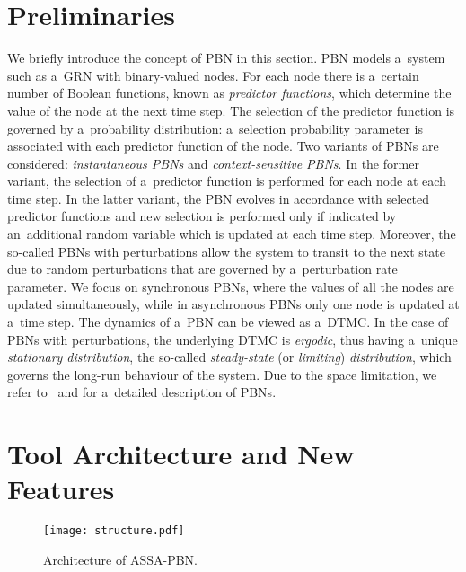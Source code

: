 \documentclass[runningheads,a4paper]{llncs}
\begin{document}
\section{Preliminaries}
\label{sec:pre}
We briefly introduce the concept of PBN in this section.
PBN models a~system such as a~GRN with binary-valued nodes. For each node there is a~certain
number of Boolean functions, known as \emph{predictor functions}, which determine the value of the
node at the next time step. The selection of the predictor function is governed by a~probability
distribution: a~selection probability parameter is associated with each predictor function of the
node. Two variants of PBNs are considered: \emph{instantaneous PBNs} and \emph{context-sensitive PBNs}. In
the former variant, the selection of a~predictor function is performed for each node at each time
step. In the latter variant, the PBN evolves in accordance with selected predictor functions and
new selection is performed only if indicated by an~additional random variable which is updated at
each time step. Moreover, the so-called PBNs with perturbations allow the system to transit to
the next state due to random perturbations that are governed by a~perturbation rate parameter.
We focus on synchronous PBNs, where the values of all the nodes are updated simultaneously,
while in asynchronous PBNs only one node is updated at a~time step.
The dynamics of a~PBN can be viewed as a~DTMC. In the case
of PBNs with perturbations, the underlying DTMC is \emph{ergodic}, thus having a~unique
\emph{stationary distribution}, the so-called \emph{steady-state} (or \emph{limiting})
\emph{distribution}, which governs the long-run behaviour of the system. Due to the space
limitation, we refer to~\cite{SD10} and \cite[page~4]{TMPTSS13} for a~detailed description of PBNs.

\section{Tool Architecture and New Features}
\label{sec:arc}
\begin{figure}[!t]
\centering
\texttt{[image: structure.pdf]}
\caption{Architecture of {\sf ASSA-PBN}.}
\label{fig:structure}
\end{figure}
\end{document}
